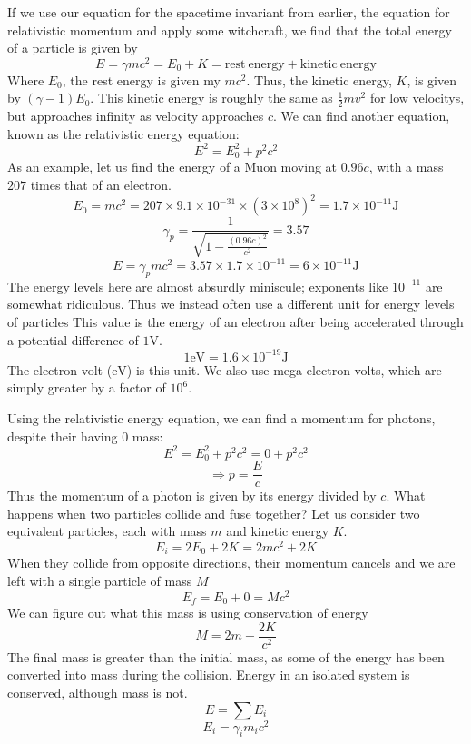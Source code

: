 \documentclass[12pt]{report}
\begin{document}
\begin{flushleft}
\bigskip
If we use our equation for the spacetime invariant from earlier, the equation
for relativistic momentum and apply some witchcraft, we find that the total 
energy of a particle is given by
\[E = \gamma mc^2 = E_0 + K = \mathrm{rest\:energy}+\mathrm{kinetic\:energy}\]
Where \(E_0\), the rest energy is given my \(mc^2\). Thus, the kinetic energy,
\(K\), is given by \((\gamma - 1)E_0\). This kinetic energy is roughly the same
as \(\frac{1}{2}mv^2\) for low velocitys, but approaches infinity as velocity 
approaches \(c\). We can find another equation, known as the relativistic 
energy equation:
\[E^2 = E_0^2 + p^2c^2\]
As an example, let us find the energy of a Muon moving at \(0.96c\), with a 
mass \(207\) times that of an electron.
\[E_0 = mc^2 = 207\times9.1\times10^{-31}\times(3\times10^8)^2 = 
1.7\times10^{-11}\mathrm{J}\]
\[\gamma_p = \frac{1}{\sqrt{1 - \frac{(0.96c)^2}{c^2}}} = 3.57\]
\[E = \gamma_p mc^2 = 3.57\times1.7\times10^{-11} = 6\times10^{-11}\mathrm{J}\]
The energy levels here are almost absurdly miniscule; exponents like 
\(10^{-11}\) are somewhat ridiculous. Thus we instead often use a different
unit for energy levels of particles This value is the energy of an electron
after being accelerated through a potential difference of \(1\mathrm{V}\).
\[1\mathrm{eV} = 1.6\times10^{-19}\mathrm{J}\]
The electron volt (\(\mathrm{eV}\)) is this unit. We also use mega-electron
volts, which are simply greater by a factor of \(10^6\).

\bigskip
Using the relativistic energy equation, we can find a momentum for photons, 
despite their having \(0\) mass:
\[E^2 = E_0^2 + p^2c^2 = 0 + p^2c^2\]
\[\Rightarrow p = \frac{E}{c}\]
Thus the momentum of a photon is given by its energy divided by \(c\).
What happens when two particles collide and fuse together? Let us consider
two equivalent particles, each with mass \(m\) and kinetic energy \(K\).
\[E_i = 2E_0 + 2K = 2mc^2 + 2K\]
When they collide from opposite directions, their momentum cancels and we are
left with a single particle of mass \(M\)
\[E_f = E_0 + 0 = Mc^2\]
We can figure out what this mass is using conservation of energy
\[M = 2m + \frac{2K}{c^2}\]
The final mass is greater than the initial mass, as some of the energy has been
converted into mass during the collision. Energy in an isolated system is 
conserved, although mass is not.
\[E = \sum E_i\]
\[E_i = \gamma_im_ic^2\]


\end{flushleft}
\end{document}
